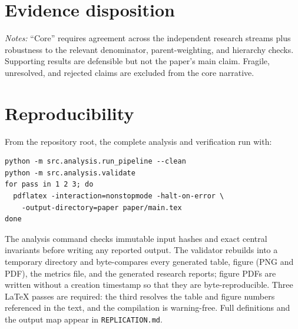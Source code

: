 \section{Evidence disposition}
\label{app:evidence}

\begin{table}[H]
\centering
\caption{Canonical classification of discovered and reviewed findings}
\scriptsize

\begin{minipage}{0.94\textwidth}
\footnotesize\vspace{0.4em}
\textit{Notes:} ``Core'' requires agreement across the independent research
streams plus robustness to the relevant denominator, parent-weighting, and
hierarchy checks. Supporting results are defensible but not the paper's main
claim. Fragile, unresolved, and rejected claims are excluded from the core
narrative.
\end{minipage}
\end{table}

\section{Reproducibility}
\label{app:reproducibility}

From the repository root, the complete analysis and verification run with:

\begin{verbatim}
python -m src.analysis.run_pipeline --clean
python -m src.analysis.validate
for pass in 1 2 3; do
  pdflatex -interaction=nonstopmode -halt-on-error \
    -output-directory=paper paper/main.tex
done
\end{verbatim}

The analysis command checks immutable input hashes and exact central
invariants before writing any reported output. The validator rebuilds into a
temporary directory and byte-compares every generated table, figure (PNG and
PDF), the metrics file, and the generated research reports; figure PDFs are
written without a creation timestamp so that they are byte-reproducible. Three
LaTeX passes are required: the third resolves the table and figure numbers
referenced in the text, and the compilation is warning-free. Full definitions
and the output map appear in \texttt{REPLICATION.md}.
